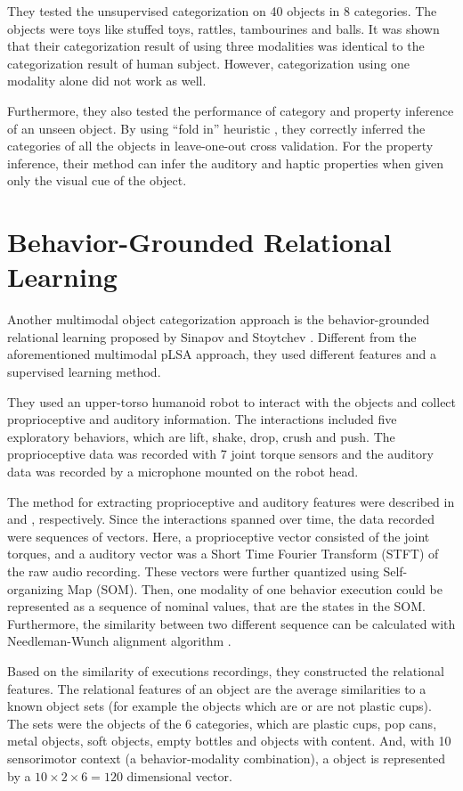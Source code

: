 \documentclass[12pt,final,twoside]{report}
\theoremstyle{plain}
\theoremstyle{definition}
\theoremstyle{remark}
\begin{document}
They tested the unsupervised categorization on 40 objects in 8 categories. The objects were toys like stuffed toys, rattles, tambourines and balls. It was shown that their categorization result of using three modalities was identical to the categorization result of human subject. However, categorization using one modality alone did not work as well.

Furthermore, they also tested the performance of category and property inference of an unseen object. By using ``fold in'' heuristic \cite{hofmann_probabilistic_1999}, they correctly inferred the categories of all the objects in leave-one-out cross validation. For the property inference, their method can infer the auditory and haptic properties when given only the visual cue of the object.

\section{Behavior-Grounded Relational Learning}
Another multimodal object categorization approach is the behavior-grounded relational learning proposed by Sinapov and Stoytchev \cite{sinapov_object_2011}. Different from the aforementioned multimodal pLSA approach, they used different features and a supervised learning method.

They used an upper-torso humanoid robot to interact with the objects and collect proprioceptive and auditory information. The interactions included five exploratory behaviors, which are lift, shake, drop, crush and push. The proprioceptive data was recorded with 7 joint torque sensors and the auditory data was recorded by a microphone mounted on the robot head.

The method for extracting proprioceptive and auditory features were described in \cite{bergquist_interactive_2009} and \cite{sinapov_interactive_2009}, respectively. Since the interactions spanned over time, the data recorded were sequences of vectors. Here, a proprioceptive vector consisted of the joint torques, and a auditory vector was a Short Time Fourier Transform (STFT) of the raw audio recording. These vectors were further quantized using Self-organizing Map (SOM). Then, one modality of one behavior execution could be represented as a sequence of nominal values, that are the states in the SOM. Furthermore, the similarity between two different sequence can be calculated with Needleman-Wunch alignment algorithm \cite{needleman_general_1970}.

Based on the similarity of executions recordings, they constructed the relational features. The relational features of an object are the average similarities to a known object sets (for example the objects which are or are not plastic cups). The sets were the objects of the 6 categories, which are plastic cups, pop cans, metal objects, soft objects, empty bottles and objects with content. And, with 10 sensorimotor context (a behavior-modality combination), a object is represented by a $10 \times 2 \times 6 = 120$ dimensional vector.
\end{document}
